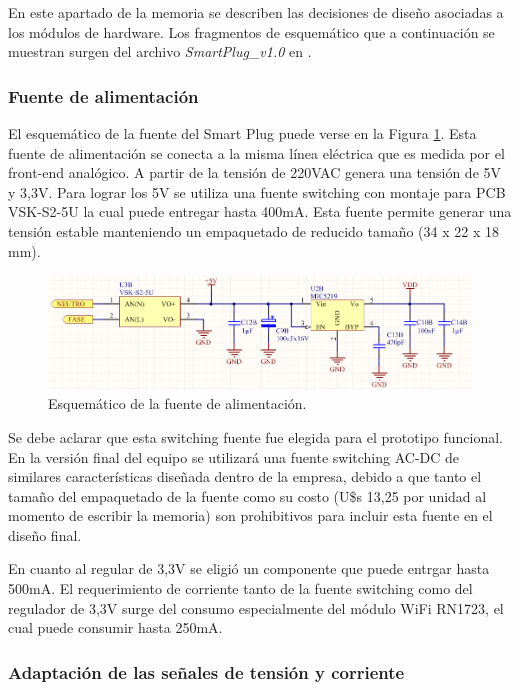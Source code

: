 En este apartado de la memoria se describen las decisiones de diseño asociadas a los módulos de hardware. Los fragmentos de esquemático que a continuación se muestran surgen del archivo \textit{SmartPlug\_v1.0} en \citep{repo_hardware}.

\subsubsection{Fuente de alimentación}

El esquemático de la fuente del Smart Plug puede verse en la Figura \ref{fig:pcb_fuente}. Esta fuente de alimentación se conecta a la misma línea eléctrica que es medida por el front-end analógico. A partir de la tensión de 220VAC genera una tensión de 5V y 3,3V. Para lograr los 5V se utiliza una fuente switching con montaje para PCB VSK-S2-5U la cual puede entregar hasta 400mA. Esta fuente permite generar una tensión estable manteniendo un empaquetado de reducido tamaño (34 x 22 x 18 mm). 

\begin{figure}[h]
	\centering
	\includegraphics[width=14cm]{./Figures/3_1_2_pcb_fuente.png}
	\caption{Esquemático de la fuente de alimentación.}
	\label{fig:pcb_fuente}
\end{figure}


Se debe aclarar que esta switching fuente fue elegida para el prototipo funcional. En la versión final del equipo se utilizará una fuente switching AC-DC de similares características diseñada dentro de la empresa, debido a que tanto el tamaño del empaquetado de la fuente como su costo (U\$s 13,25 por unidad al momento de escribir la memoria) son prohibitivos para incluir esta fuente en el diseño final.

En cuanto al regular de 3,3V se eligió un componente que puede entrgar hasta 500mA. El requerimiento de corriente tanto de la fuente switching como del regulador de 3,3V surge del consumo especialmente del módulo WiFi RN1723, el cual puede consumir hasta 250mA.


\subsubsection{Adaptación de las señales de tensión y corriente}

